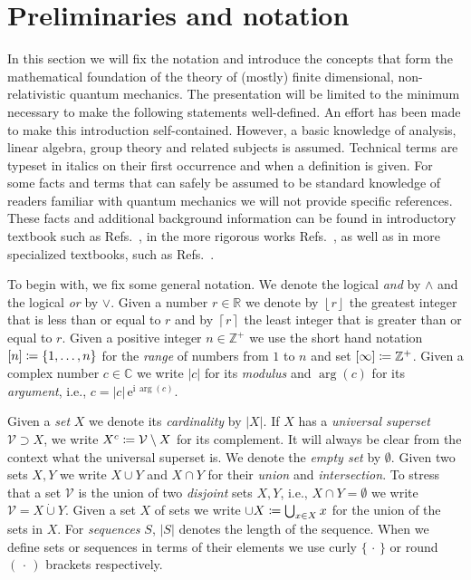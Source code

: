 \documentclass[a4paper,12pt,listof=totoc,index=totoc,bibliography=totoc,headsepline=false,headings=normal,BCOR16.153846mm,DIV12,headinclude,twoside,cleardoublepage=empty,numbers=noenddot,final]{scrreprt}
\theoremstyle{mystyle}
\numberwithin{equation}{section}
\numberwithin{figure}{section}
\numberwithin{lemma}{section}
\numberwithin{theorem}{section}
\numberwithin{corollary}{section}
\numberwithin{definition}{section}
\numberwithin{conjecture}{section}
\numberwithin{observation}{section}
\newcommand{\+}{\mkern2mu}
\newcommand{\coloneqq}{\mathrel{\vcentcolon\mkern-1.2mu=}} %
\newcommand{\union}{\cup}
\newcommand{\intersection}{\cap}
\newcommand{\dunion}{\mathbin{\dot{\cup}}}
\newcommand{\floor}[1]{\left\lfloor #1 \right\rfloor}
\newcommand{\ceiling}[1]{\left\lceil #1 \right\rceil}
\newcommand{\argdot}{{\,\cdot\,}}
\newcommand{\Vset}{\mathcal{V}}
\newcommand{\compl}[1]{{{#1}^c}}
\newcommand{\e}{\mathrm{e}}
\renewcommand{\i}{\mathrm{i}}
\DeclareMathOperator{\1}{\mathds{1}}
\newcommand{\mb}[1]{\mathbb{#1}}
\newcommand{\Z}{\mb{Z}}
\newcommand{\R}{\mb{R}}
\renewcommand{\C}{\mb{C}} %
\begin{document}
\section{Preliminaries and notation}
\label{sec:prelimiaries}
%
In this section we will fix the notation and introduce the concepts that form the mathematical foundation of the theory of (mostly) finite dimensional, non-relativistic quantum mechanics. 
The presentation will be limited to the minimum necessary to make the following statements well-defined.
An effort has been made to make this introduction self-contained.
However, a basic knowledge of analysis, linear algebra, group theory and related subjects is assumed.
Technical terms are typeset in italics on their first occurrence and when a definition is given.
For some facts and terms that can safely be assumed to be standard knowledge of readers familiar with quantum mechanics we will not provide specific references.
These facts and additional background information can be found in introductory textbook such as Refs.~\cite{FeynmanV03,Sakurai1995,nielsenchuang}, in the more rigorous works Refs.~\cite{Teschl,thirringquantu,Galindo1990,Galindo1991}, as well as in more specialized textbooks, such as Refs.~\cite{Reed1980,Reed1975,bhatia2,bhatia}.

To begin with, we fix some general notation.
We denote the logical \emph{and} by $\land$ and the logical \emph{or} by $\lor$.
Given a number $r \in \R$ we denote by $\floor r$ the greatest integer that is less than or equal to $r$ and by $\ceiling r$ the least integer that is greater than or equal to $r$.
Given a positive integer $n \in \Z^+$ we use the short hand notation $[n] \coloneqq \{1,\dots,n\}$ for the \emph{range} of numbers from $1$ to $n$ and set $[\infty] \coloneqq \Z^+$.
Given a complex number $c \in \C$ we write $|c|$ for its \emph{modulus} and $\arg(c)$ for its \emph{argument}, i.e., $c = |c|\,\e^{\i\,\arg(c)}$.

Given a \emph{set} $X$ we denote its \emph{cardinality} by $|X|$.
If $X$ has a \emph{universal superset} $\Vset \supset X$, we write $\compl X \coloneqq \Vset \setminus X$ for its complement.
It will always be clear from the context what the universal superset is.
We denote the \emph{empty set} by $\emptyset$.
Given two sets $X,Y$ we write $X \union Y$ and $X \intersection Y$ for their \emph{union} and \emph{intersection}. 
To stress that a set $\Vset$ is the union of two \emph{disjoint} sets $X,Y$, i.e., $X \cap Y = \emptyset$ we write 
$\Vset = X \dunion Y$.
Given a set $X$ of sets we write $\union X \coloneqq \bigcup_{x \in X} x$ for the union of the sets in $X$.
For \emph{sequences} $S$, $|S|$ denotes the length of the sequence.
When we define sets or sequences in terms of their elements we use curly $\{\argdot\}$ or round $(\argdot)$ brackets respectively.
\end{document}
